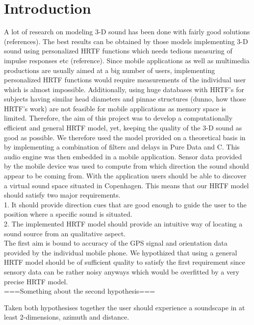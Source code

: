 \documentclass[journal]{IEEEtran}
\begin{document}
\section{Introduction}



A lot of research on modeling 3-D sound has been done with fairly good solutions (references). The best results can be obtained by those models implementing 3-D sound using personalized HRTF functions which needs tedious measuring of impulse responses etc (reference). Since mobile applications as well as multimedia productions are usually aimed at a big number of users, implementing personalized HRTF functions would require measurements of the individual user which is almost impossible. Additionally, using huge databases with HRTF's for subjects having similar head diameters and pinnae structures (dunno, how those HRTF's work) are not feasible for mobile applications as memory space is limited. Therefore, the aim of this project was to develop a computationally efficient and general HRTF model, yet, keeping the quality of the 3-D sound as good as possible. We therefore used the model provided on a theoretical basis in \cite{Brown1998} by implementing a combination of filters and delays in Pure Data and C. This audio engine was then embedded in a mobile application. Sensor data provided by the mobile device was used to compute from which direction the sound should appear to be coming from. With the application users should be able to discover a virtual sound space situated in Copenhagen. This means that our HRTF model should satisfy two major requirements. 
\\1. It should provide direction cues that are good enough to guide the user to the position where a specific sound is situated.\\2. The implemented HRTF model should provide an intuitive way of locating a sound source from an qualitative aspect. \\The first aim is bound to accuracy of the GPS signal and orientation data provided by the individual mobile phone. We hypothized that using a general HRTF model should be of sufficient quality to satisfy the first requirement since sensory data can be rather noisy anyways which would be overfitted by a very precise HRTF model.\\ ===Something about the second hypothesis===

Taken both hypothesises together the user should experience a soundscape in at least 2-dimensions, azimuth and distance.
\end{document}
